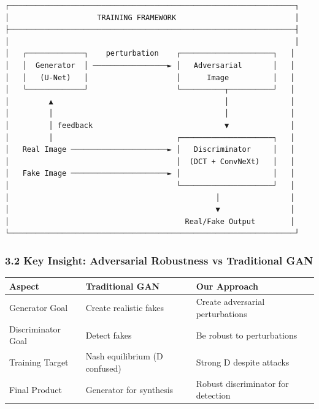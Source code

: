 \begin{verbatim}
┌─────────────────────────────────────────────────────────────────┐
│                    TRAINING FRAMEWORK                           │
├─────────────────────────────────────────────────────────────────┤
│                                                                 │
│   ┌─────────────┐    perturbation    ┌─────────────────────┐   │
│   │  Generator  │ ─────────────────► │   Adversarial       │   │
│   │   (U-Net)   │                    │      Image          │   │
│   └─────────────┘                    └──────────┬──────────┘   │
│         ▲                                       │              │
│         │                                       │              │
│         │ feedback                              ▼              │
│         │                            ┌─────────────────────┐   │
│   Real Image ──────────────────────► │   Discriminator     │   │
│                                      │  (DCT + ConvNeXt)   │   │
│   Fake Image ──────────────────────► │                     │   │
│                                      └─────────────────────┘   │
│                                               │                │
│                                               ▼                │
│                                        Real/Fake Output        │
└─────────────────────────────────────────────────────────────────┘
\end{verbatim}

\subsubsection{3.2 Key Insight: Adversarial Robustness vs Traditional
GAN}\label{key-insight-adversarial-robustness-vs-traditional-gan}

\begin{longtable}[]{@{}
  >{\raggedright\arraybackslash}p{}
  >{\raggedright\arraybackslash}p{}
  >{\raggedright\arraybackslash}p{}@{}}
\toprule\noalign{}
\begin{minipage}[b]{\linewidth}\raggedright
Aspect
\end{minipage} & \begin{minipage}[b]{\linewidth}\raggedright
Traditional GAN
\end{minipage} & \begin{minipage}[b]{\linewidth}\raggedright
Our Approach
\end{minipage} \\
\midrule\noalign{}
\endhead
\bottomrule\noalign{}
\endlastfoot
Generator Goal & Create realistic fakes & Create adversarial
perturbations \\
Discriminator Goal & Detect fakes & Be robust to perturbations \\
Training Target & Nash equilibrium (D confused) & Strong D despite
attacks \\
Final Product & Generator for synthesis & Robust discriminator for
detection \\
\end{longtable}

